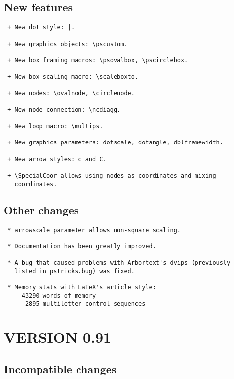 \subsection{New features}

\begin{Verbatim}
 + New dot style: |.

 + New graphics objects: \pscustom.

 + New box framing macros: \psovalbox, \pscirclebox.

 + New box scaling macro: \scaleboxto.

 + New nodes: \ovalnode, \circlenode.

 + New node connection: \ncdiagg.

 + New loop macro: \multips.

 + New graphics parameters: dotscale, dotangle, dblframewidth.

 + New arrow styles: c and C.

 + \SpecialCoor allows using nodes as coordinates and mixing
   coordinates.
\end{Verbatim}

\subsection{Other changes}

\begin{Verbatim}
 * arrowscale parameter allows non-square scaling.

 * Documentation has been greatly improved.

 * A bug that caused problems with Arbortext's dvips (previously
   listed in pstricks.bug) was fixed.

 * Memory stats with LaTeX's article style:
     43290 words of memory
      2895 multiletter control sequences
\end{Verbatim}

\section{VERSION 0.91}

\subsection{Incompatible changes}

